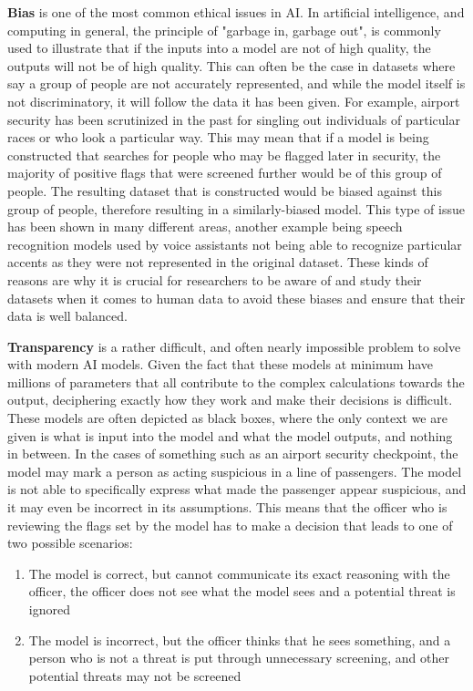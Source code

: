 \textbf{Bias} is one of the most common ethical issues in AI. In artificial intelligence, and computing in general, the principle of "garbage in, garbage out", is commonly used to illustrate that if the inputs into a model are not of high quality, the outputs will not be of high quality. This can often be the case in datasets where say a group of people are not accurately represented, and while the model itself is not discriminatory, it will follow the data it has been given. For example, airport security has been scrutinized in the past for singling out individuals of particular races or who look a particular way. This may mean that if a model is being constructed that searches for people who may be flagged later in security, the majority of positive flags that were screened further would be of this group of people. The resulting dataset that is constructed would be biased against this group of people, therefore resulting in a similarly-biased model. This type of issue has been shown in many different areas, another example being speech recognition models used by voice assistants not being able to recognize particular accents as they were not represented in the original dataset. These kinds of reasons are why it is crucial for researchers to be aware of and study their datasets when it comes to human data to avoid these biases and ensure that their data is well balanced.

\textbf{Transparency} is a rather difficult, and often nearly impossible problem to solve with modern AI models. Given the fact that these models at minimum have millions of parameters that all contribute to the complex calculations towards the output, deciphering exactly how they work and make their decisions is difficult. These models are often depicted as black boxes, where the only context we are given is what is input into the model and what the model outputs, and nothing in between. In the cases of something such as an airport security checkpoint, the model may mark a person as acting suspicious in a line of passengers. The model is not able to specifically express what made the passenger appear suspicious, and it may even be incorrect in its assumptions. This means that the officer who is reviewing the flags set by the model has to make a decision that leads to one of two possible scenarios:

\begin{enumerate}
	\item The model is correct, but cannot communicate its exact reasoning with the officer, the officer does not see what the model sees and a potential threat is ignored
	\item The model is incorrect, but the officer thinks that he sees something, and a person who is not a threat is put through unnecessary screening, and other potential threats may not be screened
\end{enumerate}

